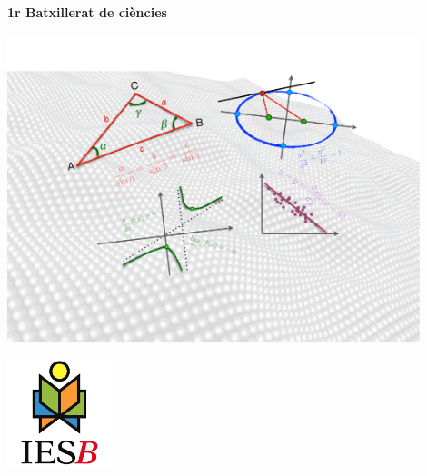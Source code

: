  \vspace*{0.05cm}


\begin{center}
	
	\shadowoffset{2pt}
	
	\begin{blueshaded}
		\begin{center} 
			\vspace{0.25cm}
			
			{\fontsize{38}{57}\selectfont 
				\textbf{}
				
		
			\vspace{0.25cm}
			{\huge \textbf{1r Batxillerat de ciències}}
			}
				
			\vspace{1cm}
			\shadowoffset{1pt}
			{\Large \textbf{}}
			
			\vspace{0.5cm}
			
			{\Large {}	}	
			\vspace{0.5cm}
		\end{center}
		
	\end{blueshaded}
	
	
	\vspace{1cm}
	
	\includegraphics[width=0.9\textwidth]{img-00/portada}
	
	\vspace{1.5cm}
	
	
	\begin{minipage}{0.4\textwidth}
		\begin{center}
			\includegraphics*[width=1.2in]{img-00/ies-binissalem-logo}
			

\end{center}
\end{minipage}
\end{center}
